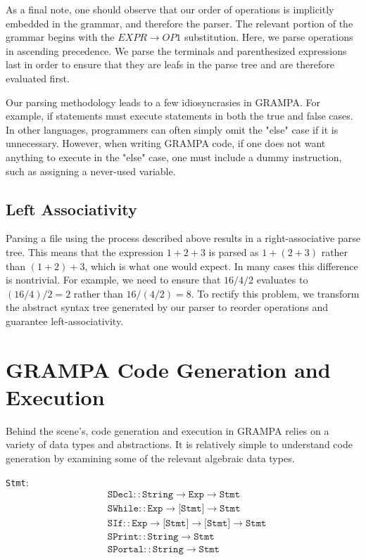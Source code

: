 \documentclass[preprint]{sigplanconf}
\begin{document}
As a final note, one should observe that our order of operations is implicitly embedded in the grammar, and therefore the parser. The relevant portion of the grammar begins with the $EXPR \rightarrow OP1$ substitution. Here, we parse operations in ascending precedence. We parse the terminals and parenthesized expressions last in order to ensure that they are leafs in the parse tree and are therefore evaluated first. 

Our parsing methodology leads to a few idiosyncrasies in GRAMPA. For example, if statements must execute statements in both the true and false cases. In other languages, programmers can often simply omit the "else" case if it is unnecessary. However, when writing GRAMPA code, if one does not want anything to execute in the "else" case, one must include a dummy instruction, such as assigning a never-used variable.

\subsection{Left Associativity}
Parsing a file using the process described above results in a right-associative parse tree. This means that the expression $1 + 2 + 3$ is parsed as $1 + (2 + 3)$ rather than $(1 + 2) + 3$, which is what one would expect. In many cases this difference is nontrivial. For example, we need to ensure that $16 / 4 / 2$ evaluates to $(16 / 4) / 2 = 2$ rather than $16 / (4 / 2) = 8$. To rectify this problem, we transform the abstract syntax tree generated by our parser to reorder operations and guarantee left-associativity. 

\section{GRAMPA Code Generation and Execution}
Behind the scene's, code generation and execution in GRAMPA relies on a variety of data types and abstractions. It is relatively simple to understand code generation by examining some of the relevant algebraic data types. 

\texttt{Stmt}:
\begin{align*}
	&\texttt{SDecl} :: \texttt{String} \rightarrow \texttt{Exp} \rightarrow \texttt{Stmt} \\
	&\texttt{SWhile} :: \texttt{Exp} \rightarrow \texttt{[Stmt]} \rightarrow \texttt{Stmt} \\
	&\texttt{SIf} :: \texttt{Exp} \rightarrow \texttt{[Stmt]} \rightarrow \texttt{[Stmt]} \rightarrow \texttt{Stmt} \\
	&\texttt{SPrint} :: \texttt{String}  \rightarrow \texttt{Stmt} \\
	&\texttt{SPortal} :: \texttt{String} \rightarrow \texttt{Stmt} 
\end{align*}
\end{document}
